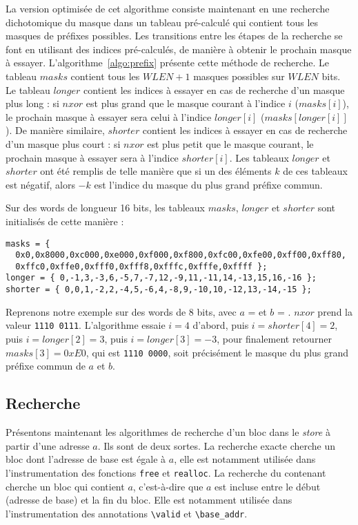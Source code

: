 La version optimisée de cet algorithme consiste maintenant en une recherche
dichotomique du masque dans un tableau pré-calculé qui contient tous les masques
de préfixes possibles.
Les transitions entre les étapes de la recherche se font en utilisant des
indices pré-calculés, de manière à obtenir le prochain masque à essayer.
L'algorithme~\ref{algo:prefix} présente cette méthode de recherche.
Le tableau $masks$ contient tous les $WLEN+1$ masques possibles sur
$WLEN$ bits.
Le tableau $longer$ contient les indices à essayer en cas de recherche d'un
masque plus long : si $nxor$ est plus grand que le masque courant à l'indice $i$
($masks[i]$), le prochain masque à essayer sera celui à l'indice $longer[i]$
($masks[longer[i]]$).
De manière similaire, $shorter$ contient les indices à essayer en cas de
recherche d'un masque plus court : si $nxor$ est plus petit que le masque
courant, le prochain masque à essayer sera à l'indice $shorter[i]$.
Les tableaux $longer$ et $shorter$ ont été remplis de telle manière que si un
des éléments $k$ de ces tableaux est négatif, alors $- k$ est l'indice du masque
du plus grand préfixe commun.

Sur des words de longueur 16 bits, les tableaux $masks$, $longer$ et $shorter$
sont initialisés de cette manière :

\begin{lstlisting}
masks = {
  0x0,0x8000,0xc000,0xe000,0xf000,0xf800,0xfc00,0xfe00,0xff00,0xff80,
  0xffc0,0xffe0,0xfff0,0xfff8,0xfffc,0xfffe,0xffff };
longer = { 0,-1,3,-3,6,-5,7,-7,12,-9,11,-11,14,-13,15,16,-16 };
shorter = { 0,0,1,-2,2,-4,5,-6,4,-8,9,-10,10,-12,13,-14,-15 };
\end{lstlisting}

Reprenons notre exemple sur des words de 8 bits, avec $a$ =
 et $b$ = .
$nxor$ prend la valeur \texttt{1110\,0111}.
L'algorithme essaie $i = 4$ d'abord, puis $i = shorter[4] = 2$, puis
$i = longer[2] = 3$, puis $i = longer[3] = -3$, pour finalement retourner
$masks[3] = 0xE0$, qui est \texttt{1110\,0000}, soit précisément le masque du
plus grand préfixe commun de $a$ et $b$.


\subsection{Recherche}


Présentons maintenant les algorithmes de recherche d'un bloc dans le
\textit{store} à partir d'une adresse $a$.
Ils sont de deux sortes.
La recherche exacte cherche un bloc dont l'adresse de base est égale à $a$, elle
est notamment utilisée dans l'instrumentation des fonctions \lstinline'free' et
\lstinline'realloc'.
La recherche du contenant cherche un bloc qui contient $a$, c'est-à-dire que
$a$ est incluse entre le début (adresse de base) et la fin du bloc.
Elle est notamment utilisée dans l'instrumentation des annotations
\lstinline'\valid' et \lstinline'\base_addr'.



